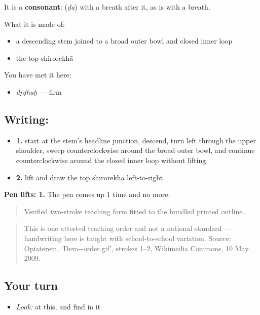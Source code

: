 It is a \textbf{consonant}: \textbf{} (\emph{ḍa}) with a breath after it, as \textbf{} is \textbf{} with a breath.

What it is made of:

\begin{itemize}
\raggedright
  \item a descending stem joined to a broad outer bowl and closed inner loop
  \item the top shirorekhā
\end{itemize}

You have met it here:

\begin{itemize}
\raggedright
  \item \textbf{} \emph{dṛḍhaḥ} — firm
\end{itemize}

\subsection*{Writing: }

\begin{itemize}
\raggedright
  \item \textbf{1.} start at the stem's headline junction, descend, turn left through the upper shoulder, sweep counterclockwise around the broad outer bowl, and continue counterclockwise around the closed inner loop without lifting
  \item \textbf{2.} lift and draw the top shirorekhā left-to-right
\end{itemize}

\textbf{Pen lifts: 1.} The pen comes up 1 time and no more.

\begin{quote}
Verified two-stroke teaching form fitted to the bundled printed outline.
\end{quote}

\begin{quote}
This is one attested teaching order and not a national standard — handwriting here is taught with school-to-school variation. Source: Opiaterein, ‘Deva--order.gif’, strokes 1–2, Wikimedia Commons, 10 May 2009.
\end{quote}

\subsection*{Your turn}
\begin{itemize}
\raggedright
  \item \emph{Look:} at this, and find  in it
\end{itemize}

